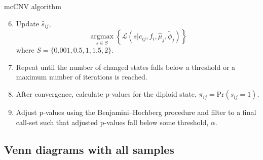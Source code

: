 \documentclass[
  10pt,
  ignorenonframetext,
  m]{beamer}
\begin{document}
\begin{frame}{mcCNV algorithm}
\protect\hypertarget{mccnv-algorithm-4}{}

\begin{enumerate}
\setcounter{enumi}{5}
\item
  Update \(\hat{s}_{ij}\), \[
    \mathop{\text{argmax}}\limits_{s \in S}\left\{
    \mathcal{L}(s \rvert c_{ij},f_i,\hat\mu_j,\tilde\phi_j)
    \right\}
    \] where \(S = \{0.001, 0.5, 1, 1.5, 2\}\).
\item
  Repeat until the number of changed states falls below a threshold or a
  maximum number of iterations is reached.
\item
  After convergence, calculate p-values for the diploid state,
  \(\pi_{ij} = \text{Pr}(s_{ij} = 1)\).
\item
  Adjust p-values using the Benjamini--Hochberg procedure and filter to
  a final call-set such that adjusted p-values fall below some
  threshold, \(\alpha\).
\end{enumerate}

\end{frame}

\hypertarget{venn-diagrams-with-all-samples}{%
\subsection{Venn diagrams with all
samples}\label{venn-diagrams-with-all-samples}}
\end{document}
